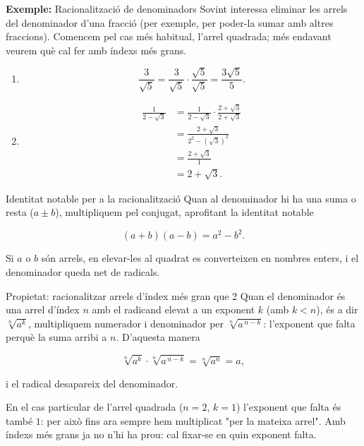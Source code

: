\begin{exemple}{\textbf{Exemple:} Racionalització de denominadors}
Sovint interessa eliminar les arrels del denominador d'una fracció (per exemple, per poder-la sumar amb altres fraccions). Comencem pel cas més habitual, l'arrel quadrada; més endavant veurem què cal fer amb índexs més grans.

\begin{enumerate}
\item \[
\frac{3}{\sqrt{5}}
= \frac{3}{\sqrt{5}} \cdot \frac{\sqrt{5}}{\sqrt{5}}
= \frac{3\sqrt{5}}{5}.
\]
\item \[
\begin{aligned}
\frac{1}{2-\sqrt{3}} &= \frac{1}{2-\sqrt{3}} \cdot \frac{2+\sqrt{3}}{2+\sqrt{3}} \\
&= \frac{2+\sqrt{3}}{2^2-\left(\sqrt{3}\right)^2} \\
&= \frac{2+\sqrt{3}}{1} \\
&= 2+\sqrt{3}.
\end{aligned}
\]
\end{enumerate}
\end{exemple}

\begin{nota}{Identitat notable per a la racionalització}
Quan al denominador hi ha una suma o resta ($a\pm b$), multipliquem pel conjugat, aprofitant la identitat notable

\[
(a+b)(a-b) = a^2 - b^2.
\]

Si $a$ o $b$ són arrels, en elevar-les al quadrat es converteixen en nombres enters, i el denominador queda net de radicals.
\end{nota}

\begin{propietat}{Propietat: racionalitzar arrels d'índex més gran que 2}
Quan el denominador és una arrel d'índex $n$ amb el radicand elevat a un exponent $k$ (amb $k<n$), és a dir $\sqrt[n]{a^k}$, multipliquem numerador i denominador per $\sqrt[n]{a^{\,n-k}}$: l'exponent que falta perquè la suma arribi a $n$. D'aquesta manera

\[
\sqrt[n]{a^k}\cdot\sqrt[n]{a^{\,n-k}} = \sqrt[n]{a^{n}} = a,
\]

i el radical desapareix del denominador.

En el cas particular de l'arrel quadrada ($n=2$, $k=1$) l'exponent que falta és també $1$: per això fins ara sempre hem multiplicat "per la mateixa arrel". Amb índexs més grans ja no n'hi ha prou: cal fixar-se en quin exponent falta.
\end{propietat}

